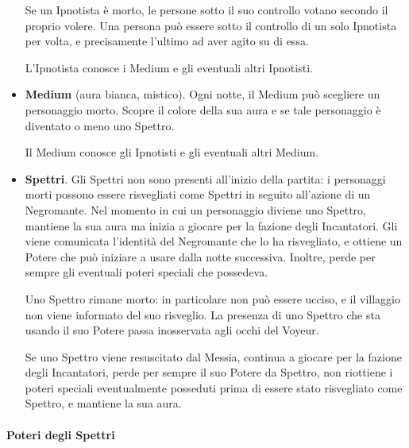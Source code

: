 \documentclass[a4paper,10pt]{article}
\begin{document}
\begin{itemize}
 Se un Ipnotista è morto, le persone sotto il suo controllo votano secondo il proprio volere.
 Una persona può essere sotto il controllo di un solo Ipnotista per volta, e precisamente l'ultimo ad aver agito su di essa.

 L'Ipnotista conosce i Medium e gli eventuali altri Ipnotisti.

 \item {\bf Medium} (aura bianca, mistico). Ogni notte, il Medium può scegliere un personaggio morto. Scopre il colore della sua aura e se tale personaggio è diventato o meno uno Spettro.

 Il Medium conosce gli Ipnotisti e gli eventuali altri Medium.

 \item {\bf Spettri}. Gli Spettri non sono presenti all'inizio della partita: i personaggi morti possono essere risvegliati come Spettri in seguito all'azione di un Negromante.
 Nel momento in cui un personaggio diviene uno Spettro, mantiene la sua aura ma inizia a giocare per la fazione degli Incantatori. Gli viene comunicata l'identità del Negromante che lo ha risvegliato, e ottiene un Potere che può iniziare a usare dalla notte successiva. Inoltre, perde per sempre gli eventuali poteri speciali che possedeva.
 
 Uno Spettro rimane morto: in particolare non può essere ucciso, e il villaggio non viene informato del suo risveglio.
 La presenza di uno Spettro che sta usando il suo Potere passa inosservata agli occhi del Voyeur.
 
 Se uno Spettro viene resuscitato dal Messia, continua a giocare per la fazione degli Incantatori, perde per sempre il suo Potere da Spettro, non riottiene i poteri speciali eventualmente posseduti prima di essere stato risvegliato come Spettro, e mantiene la sua aura.
 
\end{itemize}


\paragraph{Poteri degli Spettri}
\end{document}
